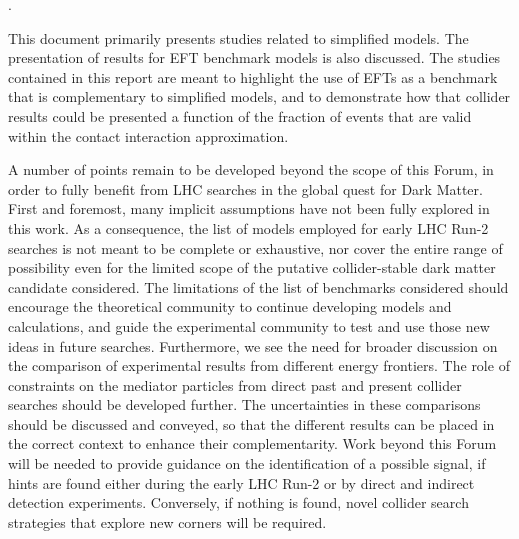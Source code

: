 . 

This document primarily presents studies related to simplified models. 
The presentation of results for EFT benchmark models is also discussed. 
The studies contained in this report are meant to highlight the use of
EFTs as a benchmark that is complementary to simplified models, 
and to demonstrate how that collider results could be presented a function of the 
fraction of events that are valid within the contact interaction approximation.  

A number of points remain to be developed beyond the scope of this Forum, 
in order to fully benefit from LHC searches in the global quest for Dark Matter.
First and foremost, many implicit assumptions have not been fully explored in this work. 
As a consequence, the list of models employed for early LHC Run-2 searches is not meant to be 
complete or exhaustive, nor cover the entire range of possibility even for the limited scope of the 
putative collider-stable dark matter candidate considered. 
The limitations of the list of benchmarks considered should encourage the theoretical community to continue developing
models and calculations, and guide the experimental community to test and use those new ideas in future searches. 
Furthermore, we see the need for broader discussion on the comparison 
of experimental results from different energy frontiers. The role of constraints on the mediator particles 
from direct past and present collider searches should be developed further. 
The uncertainties in these comparisons should be discussed and conveyed, so that the different results 
can be placed in the correct context to enhance their complementarity.
Work beyond this Forum will be needed to provide guidance on the identification of a possible signal, 
if hints are found either during the early LHC Run-2 or by direct and indirect detection experiments. Conversely,
if nothing is found, novel collider search strategies that explore new corners will be required. 

